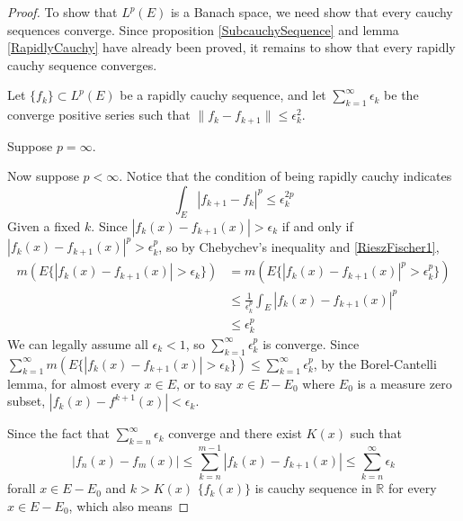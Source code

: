 \documentclass[lang=en, 12pt]{elegantbook}
\newcommand{\RR}{\mathbb{R}}
\begin{document}
        \begin{proof}
            To show that $L^p(E)$ is a Banach space, we need show that every cauchy
        sequences converge. Since proposition \ref{SubcauchySequence} and lemma
        \ref{RapidlyCauchy} have already been proved, it remains to show that every 
        rapidly cauchy sequence converges.\par 
            Let $\{f_k\} \subset L^p(E)$ be a rapidly cauchy sequence, and let 
        $\sum_{k=1}^{\infty} \epsilon_k$ be the converge positive series such that 
        $\lVert f_k-f_{k+1}\rVert \leq \epsilon^2_k$. \par 
            Suppose $p=\infty$. \par 
            Now suppose $p< \infty$. Notice that the condition of being rapidly cauchy indicates
            \begin{equation}\label{RieszFischer1}
                \int_E |f_{k+1} - f_k |^p \leq \epsilon_k^{2p}
            \end{equation}
            Given a fixed $k$. Since $|f_k(x) - f_{k+1}(x)| > \epsilon_k$ if and only if 
            $|f_k(x) - f_{k+1}(x)|^p > \epsilon_k^p$, so by Chebychev's inequality and \eqref{RieszFischer1},
        \begin{equation*}
            \begin{aligned}
                m(E\{|f_k(x) - f_{k+1}(x)|>\epsilon_k\}) &= m(E\{|f_k(x) - f_{k+1}(x)|^p>\epsilon_k^p\})\\
                &\leq \frac{1}{\epsilon_k^p} \int_E |f_k(x) - f_{k+1}(x)|^p\\
                &\leq \epsilon_k^{p}
            \end{aligned}
        \end{equation*}
            We can legally assume all $\epsilon_k< 1$, so $\sum_{k=1}^{\infty} \epsilon_{k}^p$
        is converge. Since $\sum_{k=1}^{\infty}m(E\{|f_k(x) - f_{k+1}(x)|>\epsilon_k\})
        \leq \sum_{k=1}^{\infty} \epsilon_{k}^p$, by the Borel-Cantelli lemma, for almost every 
        $x \in E$, or to say $ x \in E-E_0$ where $E_0$ is a measure zero subset, 
        $|f_k(x) - f^{k+1}(x)|< \epsilon_k$. \par Since the fact that 
        $\sum_{k=n}^{\infty}\epsilon_k$ converge and there exist $K(x)$ such that 
        $$|f_n(x) - f_{m}(x)| \leq \sum_{k=n}^{m-1}|f_k(x) - f_{k+1}(x)| \leq 
        \sum_{k=n}^{\infty}\epsilon_k$$
        forall $x \in E-E_0$ and $k> K(x)$
        $\{f_k(x)\}$ is cauchy sequence in $\RR$ for every $x \in E-E_0$, which also means 

\end{proof}
\end{document}
